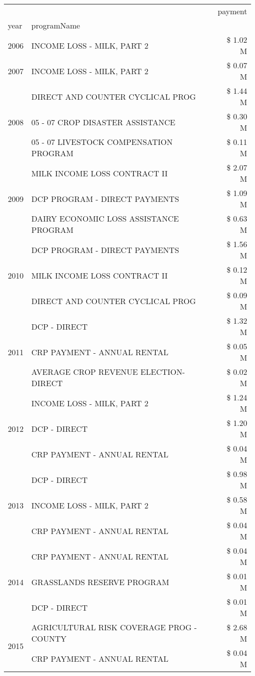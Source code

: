 \begin{tabular}{llr}
\toprule
 &  & payment \\
year & programName &  \\
\midrule
2006 & INCOME LOSS - MILK, PART 2 & \$ 1.02 M \\
\cline{1-3}
2007 & INCOME LOSS - MILK, PART 2 & \$ 0.07 M \\
\cline{1-3}
\multirow[t]{3}{*}{2008} & DIRECT AND COUNTER CYCLICAL PROG & \$ 1.44 M \\
 & 05 - 07 CROP DISASTER ASSISTANCE & \$ 0.30 M \\
 & 05 - 07 LIVESTOCK COMPENSATION PROGRAM & \$ 0.11 M \\
\cline{1-3}
\multirow[t]{3}{*}{2009} & MILK INCOME LOSS CONTRACT II & \$ 2.07 M \\
 & DCP PROGRAM - DIRECT PAYMENTS & \$ 1.09 M \\
 & DAIRY ECONOMIC LOSS ASSISTANCE PROGRAM & \$ 0.63 M \\
\cline{1-3}
\multirow[t]{3}{*}{2010} & DCP PROGRAM - DIRECT PAYMENTS & \$ 1.56 M \\
 & MILK INCOME LOSS CONTRACT II & \$ 0.12 M \\
 & DIRECT AND COUNTER CYCLICAL PROG & \$ 0.09 M \\
\cline{1-3}
\multirow[t]{3}{*}{2011} & DCP - DIRECT & \$ 1.32 M \\
 & CRP PAYMENT - ANNUAL RENTAL & \$ 0.05 M \\
 & AVERAGE CROP REVENUE ELECTION-DIRECT & \$ 0.02 M \\
\cline{1-3}
\multirow[t]{3}{*}{2012} & INCOME LOSS - MILK, PART 2 & \$ 1.24 M \\
 & DCP - DIRECT & \$ 1.20 M \\
 & CRP PAYMENT - ANNUAL RENTAL & \$ 0.04 M \\
\cline{1-3}
\multirow[t]{3}{*}{2013} & DCP - DIRECT & \$ 0.98 M \\
 & INCOME LOSS - MILK, PART 2 & \$ 0.58 M \\
 & CRP PAYMENT - ANNUAL RENTAL & \$ 0.04 M \\
\cline{1-3}
\multirow[t]{3}{*}{2014} & CRP PAYMENT - ANNUAL RENTAL & \$ 0.04 M \\
 & GRASSLANDS RESERVE PROGRAM & \$ 0.01 M \\
 & DCP - DIRECT & \$ 0.01 M \\
\cline{1-3}
\multirow[t]{3}{*}{2015} & AGRICULTURAL RISK COVERAGE PROG - COUNTY & \$ 2.68 M \\
 & CRP PAYMENT - ANNUAL RENTAL & \$ 0.04 M \\

\end{tabular}
